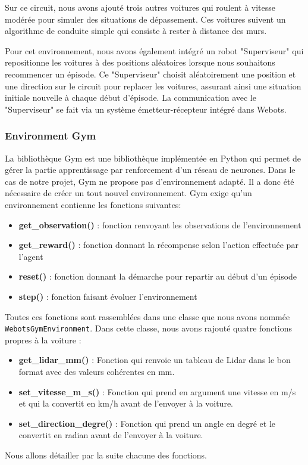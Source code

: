 \documentclass[french]{article}
\begin{document}
Sur ce circuit, nous avons ajouté trois autres voitures qui roulent à vitesse modérée pour simuler des situations 
de dépassement. Ces voitures suivent un algorithme de conduite simple qui consiste à rester à distance des murs.

\vspace{0.5cm}
Pour cet environnement, nous avons également intégré un robot "Superviseur" qui repositionne les voitures à des 
positions aléatoires lorsque nous souhaitons recommencer un épisode. Ce "Superviseur" choisit aléatoirement 
une position et une direction sur le circuit pour replacer les voitures, assurant ainsi une situation initiale 
nouvelle à chaque début d'épisode. La communication avec le "Superviseur" se fait via un système émetteur-récepteur 
intégré dans Webots.


\subsubsection*{Environment Gym}
La bibliothèque Gym est une bibliothèque implémentée en Python qui permet de gérer la partie apprentissage par 
renforcement d'un réseau de neurones. Dans le cas de notre projet, Gym ne propose pas d'environnement adapté. 
Il a donc été nécessaire de créer un tout nouvel environnement. Gym exige qu'un environnement contienne les fonctions 
suivantes:
\begin{itemize}
    \item \textbf{get\_observation()} : fonction renvoyant les observations de l'environnement
    \item \textbf{get\_reward()} : fonction donnant la récompense selon l'action effectuée par l'agent
    \item \textbf{reset()} : fonction donnant la démarche pour repartir au début d'un épisode
    \item \textbf{step()} : fonction faisant évoluer l'environnement
\end{itemize}

\vspace{0.5cm}
Toutes ces fonctions sont rassemblées dans une classe que nous avons nommée \texttt{WebotsGymEnvironment}. Dans cette classe, nous avons rajouté quatre fonctions propres à la voiture :
\begin{itemize}
\item \textbf{get\_lidar\_mm()} : Fonction qui renvoie un tableau de Lidar dans le bon format avec des valeurs cohérentes en mm.
\item \textbf{set\_vitesse\_m\_s()} : Fonction qui prend en argument une vitesse en m/s et qui la convertit en km/h avant de l'envoyer à la voiture.
\item \textbf{set\_direction\_degre()} : Fonction qui prend un angle en degré et le convertit en radian avant de l'envoyer à la voiture.
\end{itemize}
\noindent
Nous allons détailler par la suite chacune des fonctions.
\end{document}
